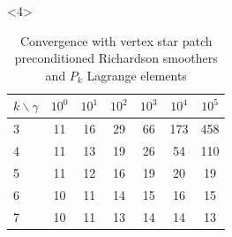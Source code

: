 \documentclass[presentation,aspectratio=43, 10pt]{beamer}
\newcommand{\convexpath}[2]{
  [
  create hullcoords/.code={
    \global\edef\namelist{#1}
    \foreach [count=\counter] \nodename in \namelist {
      \global\edef\numberofnodes{\counter}
      \coordinate (hullcoord\counter) at (\nodename);
    }
    \coordinate (hullcoord0) at (hullcoord\numberofnodes);
    \pgfmathtruncatemacro\lastnumber{\numberofnodes+1}
    \coordinate (hullcoord\lastnumber) at (hullcoord1);
  },
  create hullcoords
  ]
  ($(hullcoord1)!#2!-90:(hullcoord0)$)
  \foreach [
  evaluate=\currentnode as \previousnode using \currentnode-1,
  evaluate=\currentnode as \nextnode using \currentnode+1
  ] \currentnode in {1,...,\numberofnodes} {
    let \p1 = ($(hullcoord\currentnode) - (hullcoord\previousnode)$),
    \n1 = {atan2(\y1,\x1) + 90},
    \p2 = ($(hullcoord\nextnode) - (hullcoord\currentnode)$),
    \n2 = {atan2(\y2,\x2) + 90},
    \n{delta} = {Mod(\n2-\n1,360) - 360}
    in
    {arc [start angle=\n1, delta angle=\n{delta}, radius=#2]}
    -- ($(hullcoord\nextnode)!#2!-90:(hullcoord\currentnode)$)
  }
}
\begin{document}
\begin{frame}[fragile,t]
\begin{onlyenv}
\begin{columns}
\begin{column}{0.4\textwidth}
\begin{center}
        \end{center}
      \end{column}
    \end{columns}
  \end{onlyenv}
  \begin{onlyenv}<4>
    \begin{table}
      \centering
      {\footnotesize
      \begin{tabular}{l|cccccc}
        $k\backslash \gamma$ & $10^0$ & $10^1$ & $10^2$ & $10^3$ & $10^4$ & $10^5$ \\
        \hline
        3                    & 11     & 16     & 29     & 66     & 173    & 458    \\
        4                    & 11     & 13     & 19     & 26     & 54     & 110    \\
        5                    & 11     & 12     & 16     & 19     & 20     & 19     \\
        6                    & 10     & 11     & 14     & 15     & 16     & 15     \\
        7                    & 10     & 11     & 13     & 14     & 14     & 13     \\
      \end{tabular}
      \caption{Convergence with vertex star patch preconditioned Richardson
        smoothers and $P_k$ Lagrange elements}
      }
    \end{table}
  \end{onlyenv}
\end{frame}
\end{document}
